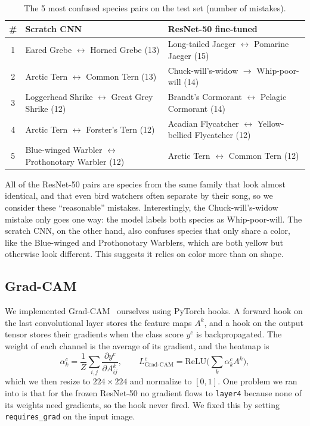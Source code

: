 \documentclass[11pt,a4paper]{article}
\newcommand{\code}[1]{\texttt{\small #1}}
\begin{document}
\begin{table}[H]
\centering
\small
\begin{tabular}{c l l}
\toprule
\textbf{\#} & \textbf{Scratch CNN} & \textbf{ResNet-50 fine-tuned} \\
\midrule
1 & Eared Grebe $\leftrightarrow$ Horned Grebe (13) & Long-tailed Jaeger $\leftrightarrow$ Pomarine Jaeger (15) \\
2 & Arctic Tern $\leftrightarrow$ Common Tern (13) & Chuck-will's-widow $\rightarrow$ Whip-poor-will (14) \\
3 & Loggerhead Shrike $\leftrightarrow$ Great Grey Shrike (12) & Brandt's Cormorant $\leftrightarrow$ Pelagic Cormorant (14) \\
4 & Arctic Tern $\leftrightarrow$ Forster's Tern (12) & Acadian Flycatcher $\leftrightarrow$ Yellow-bellied Flycatcher (12) \\
5 & Blue-winged Warbler $\leftrightarrow$ Prothonotary Warbler (12) & Arctic Tern $\leftrightarrow$ Common Tern (12) \\
\bottomrule
\end{tabular}
\caption{The 5 most confused species pairs on the test set (number of mistakes).}
\label{tab:confused}
\end{table}

All of the ResNet-50 pairs are species from the same family that look almost identical, and that even bird watchers often separate by their song, so we consider these ``reasonable'' mistakes. Interestingly, the Chuck-will's-widow mistake only goes one way: the model labels both species as Whip-poor-will. The scratch CNN, on the other hand, also confuses species that only share a color, like the Blue-winged and Prothonotary Warblers, which are both yellow but otherwise look different. This suggests it relies on color more than on shape.

\subsection{Grad-CAM}

We implemented Grad-CAM~\cite{selvaraju2017gradcam} ourselves using PyTorch hooks. A forward hook on the last convolutional layer stores the feature maps $A^k$, and a hook on the output tensor stores their gradients when the class score $y^c$ is backpropagated. The weight of each channel is the average of its gradient, and the heatmap is
\begin{equation}
  \alpha_k^c = \frac{1}{Z}\sum_{i,j}\frac{\partial y^c}{\partial A^k_{ij}}, \qquad
  L^c_{\text{Grad-CAM}} = \mathrm{ReLU}\Big(\sum_k \alpha_k^c A^k\Big),
\end{equation}
which we then resize to $224\times224$ and normalize to $[0,1]$. One problem we ran into is that for the frozen ResNet-50 no gradient flows to \code{layer4} because none of its weights need gradients, so the hook never fired. We fixed this by setting \code{requires\_grad} on the input image.
\end{document}
